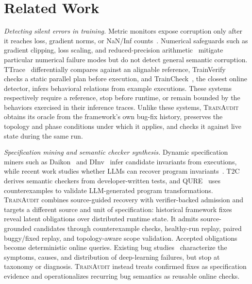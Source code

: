 \documentclass[sigconf,nonacm]{acmart}
\begin{document}
\section{Related Work}
\label{sec:related-work}

\emph{Detecting silent errors in training.}
Metric monitors expose corruption only after it reaches loss, gradient norms,
or NaN/Inf counts~\cite{jiang2025traincheck,ttrace2025}. Numerical safeguards
such as gradient clipping, loss scaling, and reduced-precision
arithmetic~\cite{pascanu2013difficulty,micikevicius2018mixed,wang2018training}
mitigate particular numerical failure modes but do not
detect general semantic corruption. TTrace~\cite{ttrace2025} differentially
compares against an alignable reference, TrainVerify~\cite{trainverify2025}
checks a static parallel plan before execution, and
TrainCheck~\cite{jiang2025traincheck}, the closest online detector, infers
behavioral relations from example executions. These systems respectively
require a reference, stop before runtime, or remain bounded by the behaviors
exercised in their inference traces. Unlike these systems, \textsc{TrainAudit}
obtains its oracle from the framework's own bug-fix history, preserves the
topology and phase conditions under which it applies, and checks it against
live state during the same run.

\emph{Specification mining and semantic checker synthesis.}
Dynamic specification miners such as Daikon~\cite{ernst2007daikon} and
DInv~\cite{grant2018inferring} infer candidate invariants from executions,
while recent work studies whether LLMs can recover program
invariants~\cite{pei2023can}. T2C~\cite{lou2025t2c} derives semantic checkers
from developer-written tests, and QURE~\cite{qure2024} uses counterexamples to
validate LLM-generated program transformations. \textsc{TrainAudit} combines
source-guided recovery with verifier-backed admission and targets a different
source and unit of specification: historical framework fixes reveal latent
obligations over distributed runtime state. It admits source-grounded candidates
through counterexample checks, healthy-run replay, paired buggy/fixed replay,
and topology-aware scope validation. Accepted obligations become deterministic
online queries. Existing bug
studies~\cite{silent_bug_2024,liu2024investigating,zang2025towards} characterize
the symptoms, causes, and distribution of deep-learning failures, but stop at
taxonomy or diagnosis. \textsc{TrainAudit} instead treats confirmed fixes as
specification evidence and operationalizes recurring bug semantics as reusable
online checks.
\end{document}
